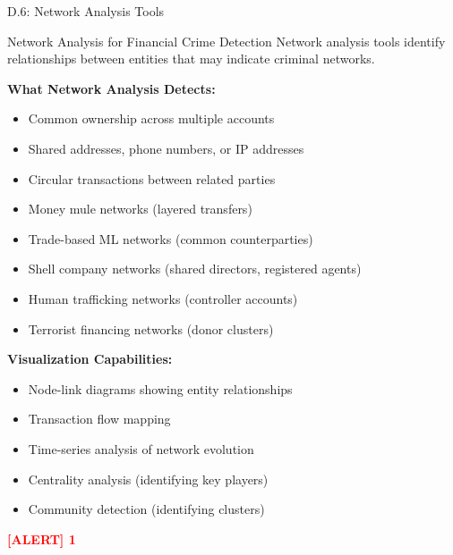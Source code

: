 \documentclass[11pt,a4paper]{beamer}
\newcommand{\redflag}[1]{\textcolor{red}{\textbf{[ALERT] 1}}}
\begin{document}
\begin{frame}{D.6: Network Analysis Tools}
	\begin{block}{Network Analysis for Financial Crime Detection}
		Network analysis tools identify relationships between entities that may indicate criminal networks.
	\end{block}
	\textbf{What Network Analysis Detects:}
	\begin{itemize}
		\item Common ownership across multiple accounts
		\item Shared addresses, phone numbers, or IP addresses
		\item Circular transactions between related parties
		\item Money mule networks (layered transfers)
		\item Trade-based ML networks (common counterparties)
		\item Shell company networks (shared directors, registered agents)
		\item Human trafficking networks (controller accounts)
		\item Terrorist financing networks (donor clusters)
	\end{itemize}
	\textbf{Visualization Capabilities:}
	\begin{itemize}
		\item Node-link diagrams showing entity relationships
		\item Transaction flow mapping
		\item Time-series analysis of network evolution
		\item Centrality analysis (identifying key players)
		\item Community detection (identifying clusters)
	\end{itemize}
	\redflag{Network analysis is particularly effective for detecting layering and money mule networks.}
\end{frame}
\end{document}
